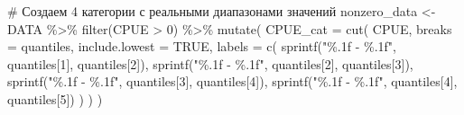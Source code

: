 \documentclass[
  letterpaper,
  DIV=11,
  numbers=noendperiod]{scrreprt}
\newenvironment{Shaded}{\begin{snugshade}}{\end{snugshade}}
\newcommand{\AttributeTok}[1]{\textcolor[rgb]{0.40,0.45,0.13}{#1}}
\newcommand{\CommentTok}[1]{\textcolor[rgb]{0.37,0.37,0.37}{#1}}
\newcommand{\ConstantTok}[1]{\textcolor[rgb]{0.56,0.35,0.01}{#1}}
\newcommand{\DecValTok}[1]{\textcolor[rgb]{0.68,0.00,0.00}{#1}}
\newcommand{\FunctionTok}[1]{\textcolor[rgb]{0.28,0.35,0.67}{#1}}
\newcommand{\NormalTok}[1]{\textcolor[rgb]{0.00,0.23,0.31}{#1}}
\newcommand{\OtherTok}[1]{\textcolor[rgb]{0.00,0.23,0.31}{#1}}
\newcommand{\SpecialCharTok}[1]{\textcolor[rgb]{0.37,0.37,0.37}{#1}}
\newcommand{\StringTok}[1]{\textcolor[rgb]{0.13,0.47,0.30}{#1}}
\begin{document}
\begin{Shaded}
\begin{Highlighting}[]
\CommentTok{\# Создаем 4 категории с реальными диапазонами значений}
\NormalTok{nonzero\_data }\OtherTok{\textless{}{-}}\NormalTok{ DATA }\SpecialCharTok{\%\textgreater{}\%} 
  \FunctionTok{filter}\NormalTok{(CPUE }\SpecialCharTok{\textgreater{}} \DecValTok{0}\NormalTok{) }\SpecialCharTok{\%\textgreater{}\%}
  \FunctionTok{mutate}\NormalTok{(}
    \AttributeTok{CPUE\_cat =} \FunctionTok{cut}\NormalTok{(}
\NormalTok{      CPUE,}
      \AttributeTok{breaks =}\NormalTok{ quantiles,}
      \AttributeTok{include.lowest =} \ConstantTok{TRUE}\NormalTok{,}
      \AttributeTok{labels =} \FunctionTok{c}\NormalTok{(}
        \FunctionTok{sprintf}\NormalTok{(}\StringTok{"\%.1f {-} \%.1f"}\NormalTok{, quantiles[}\DecValTok{1}\NormalTok{], quantiles[}\DecValTok{2}\NormalTok{]),}
        \FunctionTok{sprintf}\NormalTok{(}\StringTok{"\%.1f {-} \%.1f"}\NormalTok{, quantiles[}\DecValTok{2}\NormalTok{], quantiles[}\DecValTok{3}\NormalTok{]),}
        \FunctionTok{sprintf}\NormalTok{(}\StringTok{"\%.1f {-} \%.1f"}\NormalTok{, quantiles[}\DecValTok{3}\NormalTok{], quantiles[}\DecValTok{4}\NormalTok{]),}
        \FunctionTok{sprintf}\NormalTok{(}\StringTok{"\%.1f {-} \%.1f"}\NormalTok{, quantiles[}\DecValTok{4}\NormalTok{], quantiles[}\DecValTok{5}\NormalTok{])}
\NormalTok{      )}
\NormalTok{    )}
\NormalTok{  )}


\end{Highlighting}
\end{Shaded}
\end{document}
